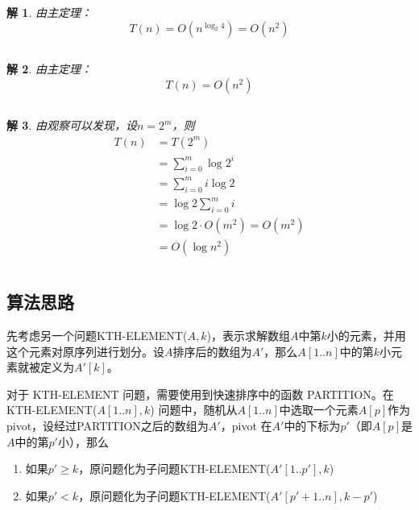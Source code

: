 \documentclass[UTF8]{ctexart}
\newtheorem*{solution}{解}[section]
\begin{document}
\subsection{}
\begin{solution}
    由主定理：
    $$T(n) = O(n^{\log_2{4}}) = O(n^2)$$
\end{solution}

\subsection{}
\begin{solution}
    由主定理：
    $$T(n) = O(n^2)$$
\end{solution}

\subsection{}
\begin{solution}
    由观察可以发现，设$n=2^m$，则
    \begin{align*}
        T(n) 
        &= T(2^m) \\
        &= \sum_{i=0}^{m}{\log 2^i} \\
        &= \sum_{i=0}^{m}{i\log 2} \\
        &= \log 2\sum_{i=0}^{m}{i} \\
        &= \log 2\cdot O(m^2) = O(m^2) \\
        &= O(\log n^2)
    \end{align*}
\end{solution}

\section{} %
\subsection*{算法思路}
先考虑另一个问题KTH-ELEMENT($A, k$)，表示求解数组$A$中第$k$小的元素，并用这个元素对原序列进行划分。设$A$排序后的数组为$A'$，那么$A[1..n]$中的第$k$小元素就被定义为$A'[k]$。

对于 KTH-ELEMENT 问题，需要使用到快速排序中的函数 PARTITION。在 KTH-ELEMENT($A[1..n], k$) 问题中，随机从$A[1..n]$中选取一个元素$A[p]$作为 pivot，设经过PARTITION之后的数组为$A'$，pivot 在$A'$中的下标为$p'$（即$A[p]$是$A$中的第$p'$小），那么
\begin{enumerate}
    \item 如果$p' \geq k$，原问题化为子问题KTH-ELEMENT($A'[1..p'], k$)
    \item 如果$p' < k$，原问题化为子问题KTH-ELEMENT($A'[p'+1..n], k-p'$)
\end{enumerate}
\end{document}
